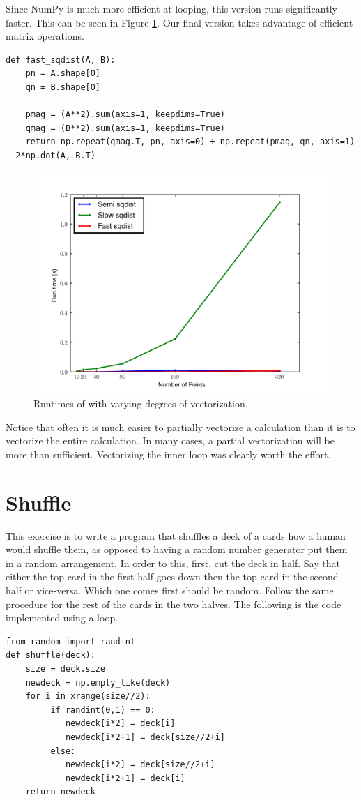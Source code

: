 Since NumPy is much more efficient at looping, this version runs significantly faster.  This can be seen in Figure \ref{fig:sqplot}.
Our final version takes advantage of efficient matrix operations.
\begin{lstlisting}
def fast_sqdist(A, B):
    pn = A.shape[0]
    qn = B.shape[0]

    pmag = (A**2).sum(axis=1, keepdims=True)
    qmag = (B**2).sum(axis=1, keepdims=True)
    return np.repeat(qmag.T, pn, axis=0) + np.repeat(pmag, qn, axis=1) - 2*np.dot(A, B.T)
\end{lstlisting}

\begin{figure}[h]
\centering
\includegraphics[width=\textwidth]{sqplot.pdf}
\caption{Runtimes of  with varying degrees of vectorization.}
\label{fig:sqplot}
\end{figure}

Notice that often it is much easier to partially vectorize a calculation than it is to vectorize the entire calculation.
In many cases, a partial vectorization will be more than sufficient.  Vectorizing the inner loop was clearly worth the effort.

\section*{Shuffle}
This exercise is to write a program that shuffles a deck of a cards how a human would shuffle them, as opposed to having a random number generator put them in a random arrangement.
In order to this, first, cut the deck in half.
Say that either the top card in the first half goes down then the top card in the second half or vice-versa.
Which one comes first should be random.
Follow the same procedure for the rest of the cards in the two halves.
The following is the code implemented using a loop.
\begin{lstlisting}
from random import randint
def shuffle(deck):
    size = deck.size
    newdeck = np.empty_like(deck)
    for i in xrange(size//2):
         if randint(0,1) == 0:
            newdeck[i*2] = deck[i]
            newdeck[i*2+1] = deck[size//2+i]
         else:
            newdeck[i*2] = deck[size//2+i]
            newdeck[i*2+1] = deck[i]
    return newdeck
\end{lstlisting}

